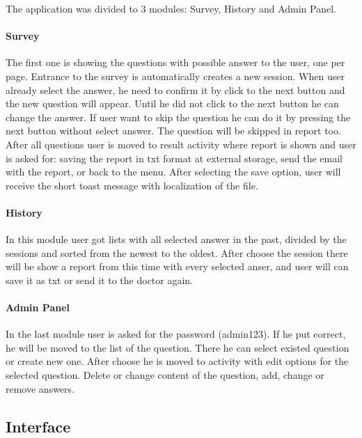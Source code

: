 \documentclass[conference]{IEEEtran}
\begin{document}
The application was divided to 3 modules: Survey, History and Admin Panel. 
\paragraph{Survey} The first one is showing the questions with possible answer to the user, one per page. Entrance to the survey is automatically creates a new session. When user 
already select the answer, he need to confirm it by click to the next button and the new question will 
appear. Until he did not click to the next button he can change the answer. If user want to skip the 
question he can do it by pressing the next button without select answer. The question will be skipped in report too.
After all questions user is moved to result activity where report is shown and user is asked for: saving the report 
in txt format at external storage, send the email with the report, or back to the menu. After selecting the save option, 
user will receive the short toast message with localization of the file. 
\paragraph{History} In this module user got lists with all selected answer in the past, divided by the sessions and sorted from the newest to the oldest. After choose the session there will be show a report from this time with every selected anser, and user will can save it as txt or send it to the doctor again.
\paragraph{Admin Panel} In the last module user is asked for the password (admin123). If he put correct, he will be moved to the list of the question. There he can select existed question or create new one. After choose he is moved to activity with edit options for the selected question. Delete or change content of the question, add, change or remove answers.


\subsection{Interface}
\end{document}
